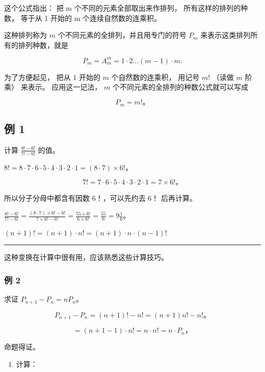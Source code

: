 这个公式指出： 把 m 个不同的元素全部取出来作排列，
所有这样的排列的种数， 等于从 1 开始的 m 个连续自然数的连乘积。

这种排列称为 \(m\) 个不同元素的全排列，并且用专门的符号 \(P_{m}\)
来表示这类排列所有的排列种数，就是

\[
P _ {m} = A _ {m} ^ {m} = 1 \cdot 2 \dots (m - 1) \cdot m.
\]

为了方便起见， 把从 1 开始的 \(m\) 个自然数的连乘积， 用记号 \(m!\)
（读做 \(m\) 阶乘） 来表示。 应用这一记法， \(m\)
个不同元素的全排列的种数公式就可以写成

\[
P_m=m!\text{。}
\]

\subsection{例 1}

计算 \(\frac{8! - 6!}{7! - 6!}\) 的值。

\(8! = 8 \cdot 7 \cdot 6 \cdot 5 \cdot 4 \cdot 3 \cdot 2 \cdot 1 = (8 \cdot 7) \times 6!\)，

\[
7! = 7 \cdot 6 \cdot 5 \cdot 4 \cdot 3 \cdot 2 \cdot 1 = 7 \times 6!\text{，}
\]

所以分子分母中都含有因数 6！，可以先约去 6！ 后再计算。

\(\frac{8! - 6!}{7! - 6!} = \frac{(8 \cdot 7) \times 6! - 6!}{7 \times 6! - 6!} = \frac{55 \times 6!}{6 \times 6!} = \frac{55}{6} = 9\frac{1}{6}\)。

\((n + 1)! = (n + 1) \cdot n! = (n + 1) \cdot n \cdot (n - 1)!\)

\begin{center}\rule{0.5\linewidth}{0.5pt}\end{center}

这种变换在计算中很有用，应该熟悉这些计算技巧。

\subsubsection{例 2}

求证 \(P_{n+1} - P_n = nP_n\)。


\[
P_{n+1}-P_n=(n+1)!-n!=(n+1)n!-n!\text{。}
\]

\[
= (n + 1 - 1) \cdot n! = n \cdot n! = n \cdot P _ {n}\text{，}
\]

命题得证。

\begin{enumerate}
\item
  计算：
\end{enumerate}

